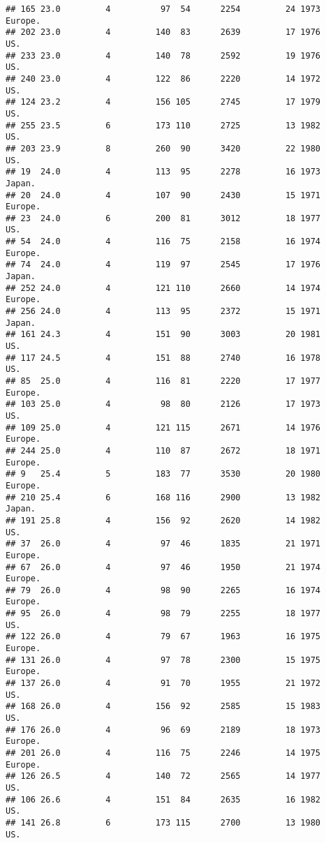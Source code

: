 \documentclass[11pt,]{article}
\begin{document}
\begin{verbatim}
## 165 23.0         4          97  54      2254         24 1973  Europe.
## 202 23.0         4         140  83      2639         17 1976      US.
## 233 23.0         4         140  78      2592         19 1976      US.
## 240 23.0         4         122  86      2220         14 1972      US.
## 124 23.2         4         156 105      2745         17 1979      US.
## 255 23.5         6         173 110      2725         13 1982      US.
## 203 23.9         8         260  90      3420         22 1980      US.
## 19  24.0         4         113  95      2278         16 1973   Japan.
## 20  24.0         4         107  90      2430         15 1971  Europe.
## 23  24.0         6         200  81      3012         18 1977      US.
## 54  24.0         4         116  75      2158         16 1974  Europe.
## 74  24.0         4         119  97      2545         17 1976   Japan.
## 252 24.0         4         121 110      2660         14 1974  Europe.
## 256 24.0         4         113  95      2372         15 1971   Japan.
## 161 24.3         4         151  90      3003         20 1981      US.
## 117 24.5         4         151  88      2740         16 1978      US.
## 85  25.0         4         116  81      2220         17 1977  Europe.
## 103 25.0         4          98  80      2126         17 1973      US.
## 109 25.0         4         121 115      2671         14 1976  Europe.
## 244 25.0         4         110  87      2672         18 1971  Europe.
## 9   25.4         5         183  77      3530         20 1980  Europe.
## 210 25.4         6         168 116      2900         13 1982   Japan.
## 191 25.8         4         156  92      2620         14 1982      US.
## 37  26.0         4          97  46      1835         21 1971  Europe.
## 67  26.0         4          97  46      1950         21 1974  Europe.
## 79  26.0         4          98  90      2265         16 1974  Europe.
## 95  26.0         4          98  79      2255         18 1977      US.
## 122 26.0         4          79  67      1963         16 1975  Europe.
## 131 26.0         4          97  78      2300         15 1975  Europe.
## 137 26.0         4          91  70      1955         21 1972      US.
## 168 26.0         4         156  92      2585         15 1983      US.
## 176 26.0         4          96  69      2189         18 1973  Europe.
## 201 26.0         4         116  75      2246         14 1975  Europe.
## 126 26.5         4         140  72      2565         14 1977      US.
## 106 26.6         4         151  84      2635         16 1982      US.
## 141 26.8         6         173 115      2700         13 1980      US.

\end{verbatim}
\end{document}
